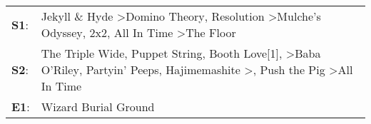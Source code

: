 \begin{supertabular}{p{0.03\textwidth}p{0.92\textwidth}}
 \textbf{S1}:  &                                                                                                                            Jekyll \& Hyde\textsuperscript{} \textgreater \enspace Domino Theory\textsuperscript{}, \enspace Resolution\textsuperscript{} \textgreater \enspace Mulche's Odyssey\textsuperscript{}, \enspace 2x2\textsuperscript{}, \enspace All In Time\textsuperscript{} \textgreater \enspace The Floor\textsuperscript{}  \enspace  \\
 \textbf{S2}:  &  The Triple Wide\textsuperscript{}, \enspace Puppet String\textsuperscript{}, \enspace Booth Love[1]\textsuperscript{}, \textsuperscript{} \textgreater \enspace Baba O'Riley\textsuperscript{}, \enspace Partyin' Peeps\textsuperscript{}, \enspace Hajimemashite\textsuperscript{} \textgreater {}\textsuperscript{}, \enspace Push the Pig\textsuperscript{} \textgreater \enspace All In Time\textsuperscript{}  \enspace  \\
 \textbf{E1}:  &                                                                                                                                                                                                                                                                                                                                                                                                      Wizard Burial Ground\textsuperscript{}  \enspace  \\
\end{supertabular}
